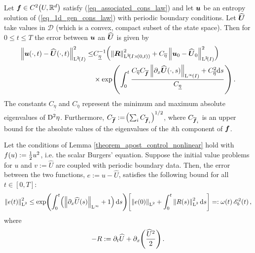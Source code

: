\documentclass[final]{amsart}
\newcommand{\Coeta}{C_{\overline{\eta}}}
\newcommand{\Cof}{C_{\overline{\vect{f}}}}
\newcommand{\Cofi}{C_{\overline{\vect{f}}_i}}
\newcommand{\Cueta}{C_{\underline{\eta}}}
\newcommand{\recgs}[1]{\widehat{\vec{#1}}}
\renewcommand{\vect}[1]{\geovec{#1}}
\renewcommand{\vec}[1]{\geovec{#1}}
\numberwithin{equation}{section}
\begin{document}
\begin{Lem} \label{theorem_apost_control_nonlinear}Let $\vec{f}\in C^2\qp{U,\mathbb{R}^d}$ satisfy (\ref{eq_associated_cons_law}) and let $\vec{u}$ be an entropy solution of (\ref{eq_1d_gen_cons_law}) with periodic boundary conditions.  Let $\recgs{U}$ take values in $\mathcal{D}$ (which is a convex, compact subset of the state space).  Then for $0\leq t\leq T$ the error between $\vec{u}$ an  $\recgs{U}$ is given by 
\begin{equation}\label{eq_bound}
\begin{aligned}
\Norm{\vect{u}\qp{\cdot,t}-\recgs{U}\qp{\cdot,t}}^2_{\leb{2}\qp{I}}\leq&
\Cueta^{-1}\qp{\Norm{\vect{R}}^2_{\leb{2}\qp{I\times\qp{0,t}}}
  +\Coeta\Norm{\vect{u}_0-\recgs{U}_0}^2_{\leb{2}\qp{I}}}\\ &\times\exp\qp{\int_0^t\frac{\Coeta
    \Cof \Norm{\partial_x\recgs{U}\qp{\cdot,s}}_{\leb{\infty}\qp{I}}
    +\Coeta^2\mathrm{d}s}{\Cueta}}.
\end{aligned}
\end{equation}
The constants $\Cueta$ and $\Coeta$ represent the minimum and maximum absolute eigenvalues of $\mathrm{D}^2 \eta$. Furthermore, $\Cof:=\qp{\sum_i \Cofi}^{1/2}$, where $\Cofi$ is an upper bound for the absolute values of the eigenvalues of the \textit{i}th component of $\vec{f}$.
\end{Lem}

\begin{Cor}
	\label{cor_stab_control_burgers}
	Let the conditions of Lemma
        \ref{theorem_apost_control_nonlinear} hold with
        $f\!\left({u}\right):=\frac{1}{2}u^2$, i.e. the scalar Burgers'
        equation. Suppose the initial value problems for $u$ and
        $v:=\widehat{U}$ are coupled with periodic boundary data.
        Then, the error between the two functions, $e:=
        u-\widehat{U}$, satisfies the following bound for all $t\in
        [0,T]$:
	\begin{equation}\label{eq:burgers_bound}
	\Norm{e\qp{t}}^2_{\leb{2}}\leq \exp\qp{\int_0^t\qp{\Norm{\partial_x\widehat{U}\qp{s}}_{\leb{\infty}}+1}\mathrm{d}s}\qb{\Norm{e\qp{0}}_{\leb{2}}+\int_0^t\Norm{R\qp{s}}^2_{\leb{2}}\mathrm{d}s}=: \w\qp{t}\cE_b^2\qp{t},
	\end{equation}
	where 
	\begin{equation}
-R:=\partial_t\widehat{U} +\partial_x\!\left({\frac{\widehat{U}^2}{2}}\right).
	\end{equation}
\end{Cor}
\end{document}
